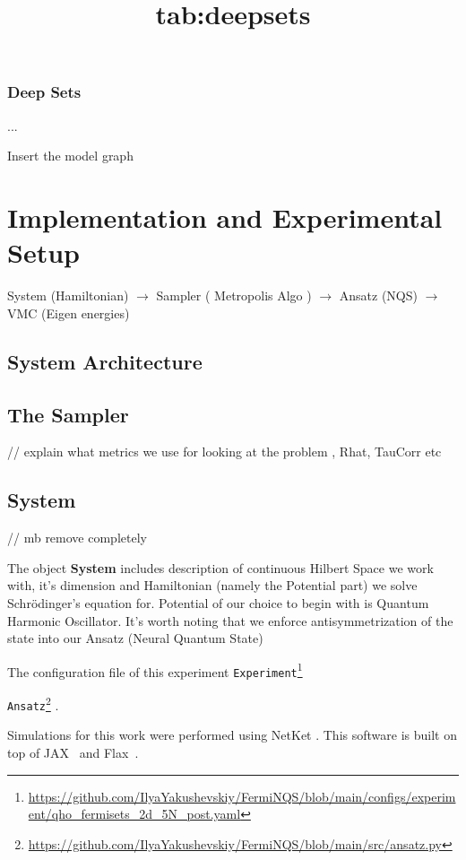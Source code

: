 \documentclass[a4paper,11pt,twoside]{article}
\begin{document}
\title{tab:deepsets}
\subsubsection{Deep Sets}


... 

Insert the model graph 

\newpage



\section{Implementation and Experimental Setup}

System (Hamiltonian) $\rightarrow$ Sampler ( Metropolis Algo ) $\rightarrow$ Ansatz (NQS) $\rightarrow$ VMC (Eigen energies)

\subsection{System Architecture}

\subsection{The Sampler}

// explain what metrics we use for looking at the problem , Rhat, TauCorr etc 

\subsection{System}
\label{impl:sys}

// mb remove completely 

The object \textbf{System} includes description of continuous Hilbert Space we work with, it's dimension and Hamiltonian (namely the Potential part) we solve Schrödinger's equation for. Potential of our choice to begin with is Quantum Harmonic Oscillator. 
It's worth noting that we enforce antisymmetrization of the state into our Ansatz (Neural Quantum State) 

The configuration file of this experiment \texttt{Experiment}\footnote{\url{https://github.com/IlyaYakushevskiy/FermiNQS/blob/main/configs/experiment/qho_fermisets_2d_5N_post.yaml}}

\texttt{Ansatz}\footnote{\url{https://github.com/IlyaYakushevskiy/FermiNQS/blob/main/src/ansatz.py}} .



Simulations for this work were performed using 
NetKet \cite{carleo_netket_2019, vicentini_netket_2022}. This software is built on top of JAX~\cite{bradbury_jax_2018} 
and Flax~\cite{heek_flax_2024}.
\end{document}
